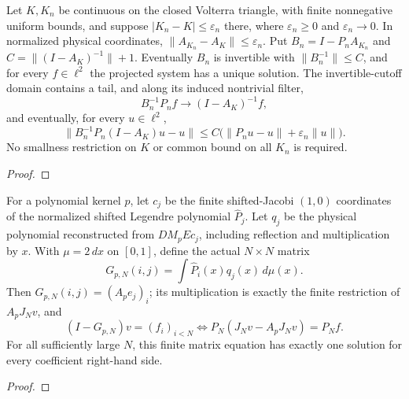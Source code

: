 \begin{supporting}
\begin{theorem}
\label{thm:volterra-approximate-solves}
\leanok
Let $K,K_n$ be continuous on the closed Volterra triangle, with finite
nonnegative uniform bounds, and suppose
$|K_n-K|\le\varepsilon_n$ there, where $\varepsilon_n\ge0$ and
$\varepsilon_n\to0$. In normalized physical coordinates,
$\|A_{K_n}-A_K\|\le\varepsilon_n$. Put $B_n=I-P_nA_{K_n}$ and
$C=\|(I-A_K)^{-1}\|+1$. Eventually $B_n$ is invertible with
$\|B_n^{-1}\|\le C$, and for every $f\in\ell^2$ the projected system
has a unique solution. The invertible-cutoff domain contains a tail, and along its induced nontrivial filter,
\[
 B_n^{-1}P_nf\longrightarrow (I-A_K)^{-1}f,
\]
and eventually, for every $u\in\ell^2$,
\[
 \|B_n^{-1}P_n(I-A_K)u-u\|
 \le C\bigl(\|P_nu-u\|+\varepsilon_n\|u\|\bigr).
\]
No smallness restriction on $K$ or common bound on all $K_n$ is required.
\end{theorem}
\begin{proof}
\leanok
\end{proof}

\begin{theorem}
\label{thm:volterra-proriol-matrix}
\leanok
For a polynomial kernel $p$, let $c_j$ be the finite shifted-Jacobi $(1,0)$
coordinates of the normalized shifted Legendre polynomial $\widehat P_j$.
Let $q_j$ be the physical polynomial reconstructed from $D M_p E c_j$,
including reflection and multiplication by $x$. With $\mu=2\,dx$ on $[0,1]$,
define the actual $N\times N$ matrix
\[
 G_{p,N}(i,j)=\int\widehat P_i(x)q_j(x)\,d\mu(x).
\]
Then $G_{p,N}(i,j)=(A_pe_j)_i$; its multiplication is exactly the finite
restriction of $A_pJ_Nv$, and
\[
 (I-G_{p,N})v=(f_i)_{i<N}
 \iff P_N(J_Nv-A_pJ_Nv)=P_Nf.
\]
For all sufficiently large $N$, this finite matrix equation has exactly
one solution for every coefficient right-hand side.
\end{theorem}
\begin{proof}
\leanok
\end{proof}


\end{supporting}
